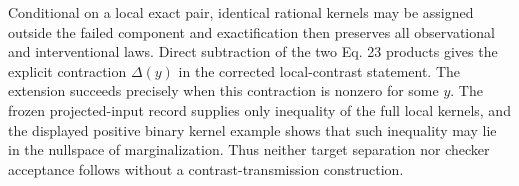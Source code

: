 Conditional on a local exact pair, identical rational kernels may be assigned outside the failed component and exactification then preserves all observational and interventional laws. Direct subtraction of the two Eq. 23 products gives the explicit contraction \(\Delta(y)\) in the corrected local-contrast statement. The extension succeeds precisely when this contraction is nonzero for some \(y\). The frozen projected-input record supplies only inequality of the full local kernels, and the displayed positive binary kernel example shows that such inequality may lie in the nullspace of marginalization. Thus neither target separation nor checker acceptance follows without a contrast-transmission construction.